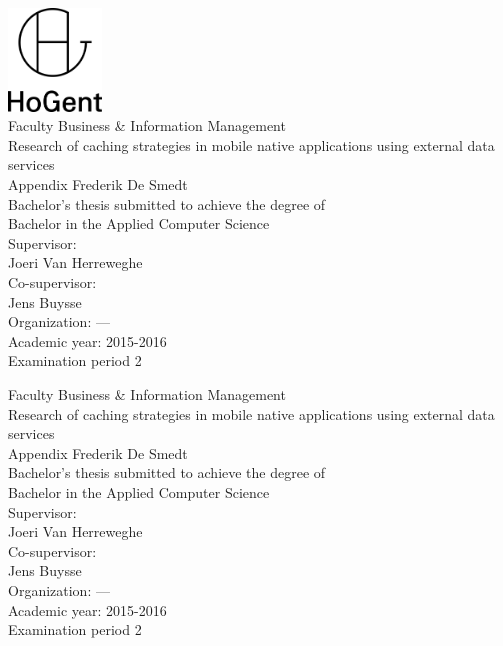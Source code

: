 \documentclass[pdftex,a4paper,12pt,twoside]{report}
\newcommand{\emptypage}{
\newpage
\thispagestyle{empty}
\mbox{}
\newpage
}
\newcommand{\student}{Frederik De Smedt}
\newcommand{\promotor}{Joeri Van Herreweghe}
\newcommand{\copromotor}{Jens Buysse}
\newcommand{\instelling}{---}
\newcommand{\titel}{Research of caching strategies in mobile native applications using external data services}
\newcommand{\faculteit}{Faculty Business \& Information Management}
\newcommand{\rapporttype}{Bachelor's thesis submitted to achieve the degree of\\Bachelor in the Applied Computer Science}
\newcommand{\academiejaar}{2015-2016}
\newcommand{\examenperiode}{Examination period 2}
\begin{document}

\begin{titlepage}
  \begin{center}

    \begingroup
    \rmfamily
    \includegraphics[width=2.5cm]{img/HG-beeldmerk-woordmerk}\\[.5cm]
    \faculteit\\[3cm]
    \titel\\[1cm]
    Appendix
    \vfill
    \student\\[3.5cm]
    \rapporttype\\[2cm]
    Supervisor:\\
    \promotor\\
    Co-supervisor:\\
    \copromotor\\[2.5cm]
    Organization: \instelling\\[.5cm]
    Academic year: \academiejaar\\[.5cm]
    \examenperiode
    \endgroup

  \end{center}
  \restoregeometry
\end{titlepage}


\emptypage


\begin{titlepage}
  \begin{center}

    \begingroup
    \rmfamily
    \faculteit\\[3cm]
    \titel\\[1cm]
    Appendix
    \vfill
    \student\\[3.5cm]
    \rapporttype\\[2cm]
    Supervisor:\\
    \promotor\\
    Co-supervisor:\\
    \copromotor\\[2.5cm]
    Organization: \instelling\\[.5cm]
    Academic year: \academiejaar\\[.5cm]
    \examenperiode
    \endgroup

  \end{center}
  \restoregeometry
\end{titlepage}
\end{document}
